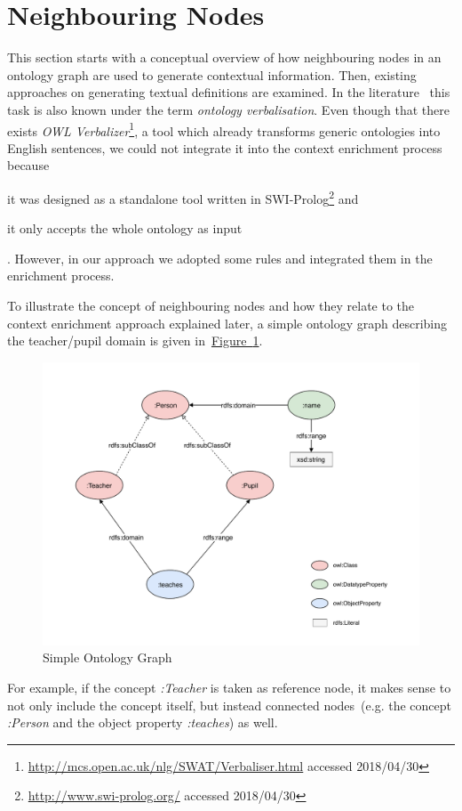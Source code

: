\documentclass[draft,final]{vutinfth} %
\begin{document}
\section{Neighbouring Nodes}\label{sec:neighboring_nodes}
This section starts with a conceptual overview of how neighbouring nodes in an ontology graph are used to generate contextual information. Then, existing approaches on generating textual definitions are examined. In the literature~\cite{soton265735} this task is also known under the term \textit{ontology verbalisation}. Even though that there exists \textit{OWL Verbalizer}\footnote{\url{http://mcs.open.ac.uk/nlg/SWAT/Verbaliser.html} accessed 2018/04/30}, a tool which already transforms generic ontologies into English sentences, we could not integrate it into the context enrichment process because 
\begin{inparaenum}[a)]
		\item it was designed as a standalone tool written in SWI-Prolog\footnote{\url{http://www.swi-prolog.org/} accessed 2018/04/30} and
		\item it only accepts the whole ontology as input
\end{inparaenum}.
However, in our approach we adopted some rules and integrated them in the enrichment process.

To illustrate the concept of neighbouring nodes and how they relate to the context enrichment approach explained later, a simple ontology graph describing the teacher/pupil domain is given in~\hyperref[fig:simple_owl_graph]{Figure~\ref*{fig:simple_owl_graph}}.
\begin{figure}
	 \centering
	 \includegraphics[width=\textwidth]{drawio/University_Ontology_Example}
	 \caption{Simple Ontology Graph}\label{fig:simple_owl_graph}
\end{figure}
For example, if the concept \textit{:Teacher} is taken as reference node, it makes sense to not only include the concept itself, but instead connected nodes~(e.g. the concept \textit{:Person} and the object property \textit{:teaches}) as well. 
\end{document}
